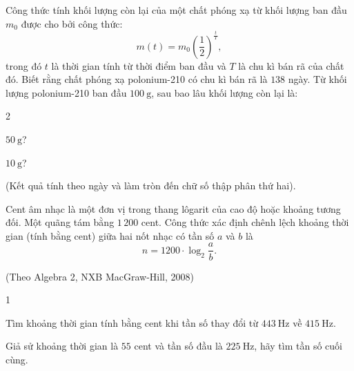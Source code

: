 \begin{bt}%
	Công thức tính khối lượng còn lại của một chất phóng xạ từ khối lượng ban đầu $m_0$ được cho bởi công thức:
	$$m(t)=m_0\left(\dfrac{1}{2}\right)^{\tfrac{t}{T}},$$
	trong đó $t$ là thời gian tính từ thời điểm ban đầu và $T$ là chu kì bán rã của chất đó. Biết rằng chất phóng xạ polonium-210 có chu kì bán rã là $ 138 $ ngày. Từ khối lượng polonium-210 ban đầu $100 \mathrm{~g}$, sau bao lâu khối lượng còn lại là:
	\begin{enumEX}{2}
		\item $50 \mathrm{~g}$?
		\item $10 \mathrm{~g}$?
	\end{enumEX}
	(Kết quả tính theo ngày và làm tròn đến chữ số thập phân thứ hai).
\end{bt}

\begin{bt}%
	Cent âm nhạc là một đơn vị trong thang lôgarit của cao độ hoặc khoảng tương đối. Một quãng tám bằng $ 1\,200 $ cent. Công thức xác định chênh lệch khoảng thời gian (tính bằng cent) giữa hai nốt nhạc có tần số $a$ và $b$ là
	$$n=1200 \cdot \log_2 \dfrac{a}{b}.$$
\begin{flushright}
	(Theo Algebra 2, NXB MacGraw-Hill, 2008)
\end{flushright}
	\begin{enumEX}{1}
		\item Tìm khoảng thời gian tính bằng cent khi tần số thay đổi từ $443 \mathrm{~Hz}$ về $415 \mathrm{~Hz}$.
		\item Giả sử khoảng thời gian là $ 55 $ cent và tần số đầu là $225 \mathrm{~Hz}$, hãy tìm tần số cuối cùng.
	\end{enumEX}
\end{bt}

